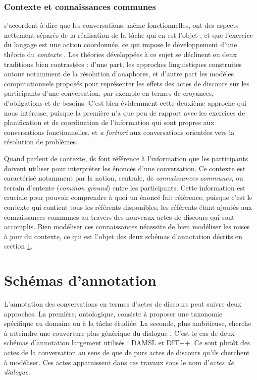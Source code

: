 \documentclass[10pt,a4paper,twoside]{article}
\begin{document}
\subsubsection{Contexte et connaissances communes}

\citeauthor{poesio1997conversational} s'accordent à dire que les conversations, même fonctionnelles, ont des aspects nettement séparés de la réalisation de la tâche qui en est l'objet \cite{poesio1998towards}, et que l'exercice du langage est une action coordonnée, ce qui impose le développement d'une théorie du \textit{contexte} \cite{poesio1997conversational}. Les théories développées à ce sujet se déclinent en deux traditions bien contrastées : d'une part, les approches linguistiques construites autour notamment de la résolution d'anaphores, et d'autre part les modèles computationnels proposés pour représenter les effets des actes de discours sur les participants d'une conversation, par exemple en termes de croyances, d'obligations et de besoins. C'est bien évidemment cette deuxième approche qui nous intéresse, puisque la première n'a que peu de rapport avec les exercices de planification et de coordination de l'information qui sont propres aux conversations fonctionnelles, et \textit{a fortiori} aux conversations orientées vers la résolution de problèmes.

Quand \citeauthor{poesio1997conversational} parlent de contexte, ils font référence à l'information que les participants doivent utiliser pour interpréter les énoncés d'une conversation. Ce contexte est caractérisé notamment par la notion, centrale, de \textit{connaissances communes}, ou \og terrain d'entente \fg{} (\textit{common ground}) entre les participants. Cette information est cruciale pour pouvoir comprendre à quoi un énoncé fait référence, puisque c'est le contexte qui contient tous les référents disponibles, les référents étant ajoutés aux connaissances communes au travers des nouveaux actes de discours qui sont accomplis. Bien modéliser ces connaissances nécessite de bien modéliser les mises à jour du contexte, ce qui est l'objet des deux schémas d'annotation décrits en section \ref{sec:annotation_schemes}.

\section{Schémas d'annotation}
\label{sec:annotation_schemes}

L'annotation des conversations en termes d'actes de discours peut suivre deux approches. La première, ontologique, consiste à proposer une taxonomie spécifique au domaine ou à la tâche étudiée. La seconde, plus ambitieuse, cherche à atteindre une couverture plus générique du dialogue \cite{leech2003generic}. C'est le cas de deux schémas d'annotation largement utilisés : DAMSL et DIT++. Ce sont plutôt des actes de la conversation au sens de \citeauthor{traum1992conversation} que de purs actes de discours qu'ils cherchent à modéliser. Ces actes apparaissent dans ces travaux sous le nom d'\textit{actes de dialogue}.
\end{document}
